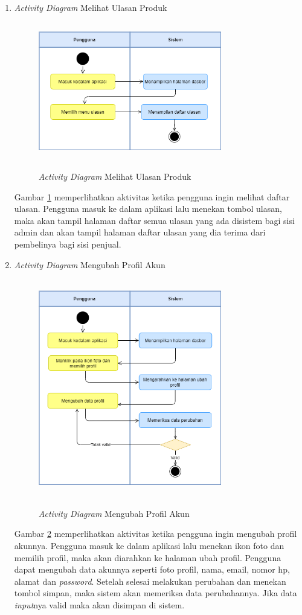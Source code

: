 \begin{enumerate}
	\item \textit{Activity Diagram} Melihat Ulasan Produk
	\begin{figure}[H]
		\centering
		{\includegraphics [width = 8cm, height= 6cm]{gambar/activity diagram/lihat ulasan}}
		\caption{\textit{Activity Diagram} Melihat Ulasan Produk}
		\label{lihat ulasan}
	\end{figure}
	\par Gambar \ref*{lihat ulasan} memperlihatkan aktivitas ketika pengguna ingin melihat daftar ulasan. Pengguna masuk ke dalam aplikasi lalu menekan tombol ulasan, maka akan tampil halaman daftar semua ulasan yang ada disistem bagi sisi admin dan akan tampil halaman daftar ulasan yang dia terima dari pembelinya bagi sisi penjual.

	\newpage
	\item \textit{Activity Diagram} Mengubah Profil Akun
	\begin{figure}[H]
		\centering
		{\includegraphics [width = 8cm, height= 9.5cm]{gambar/activity diagram/ubah profil}}
		\caption{\textit{Activity Diagram} Mengubah Profil Akun}
		\label{ubah profil}
	\end{figure}
	\par Gambar \ref*{ubah profil} memperlihatkan aktivitas ketika pengguna ingin mengubah profil akunnya. Pengguna masuk ke dalam aplikasi lalu menekan ikon foto dan memilih profil, maka akan diarahkan ke halaman ubah profil. Pengguna dapat mengubah data akunnya seperti foto profil, nama, email, nomor hp, alamat dan \textit{password}. Setelah selesai melakukan perubahan dan menekan tombol simpan, maka sistem akan memeriksa data perubahannya. Jika data \textit{input}nya valid maka akan disimpan di sistem.
\end{enumerate}


